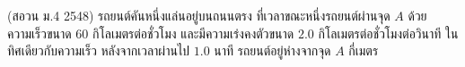 (สอวน ม.4 2548) รถยนต์คันหนึ่งแล่นอยู่บนถนนตรง ที่เวลาขณะหนึ่งรถยนต์ผ่านจุด $A$ ด้วยความเร็วขนาด $60$ กิโลเมตรต่อชั่วโมง และมีความเร่งคงตัวขนาด $2.0$ กิโลเมตรต่อชั่วโมงต่อวินาที ในทิศเดียวกับความเร็ว หลังจากเวลาผ่านไป $1.0$ นาที รถยนต์อยู่ห่างจากจุด $A$ กี่เมตร
